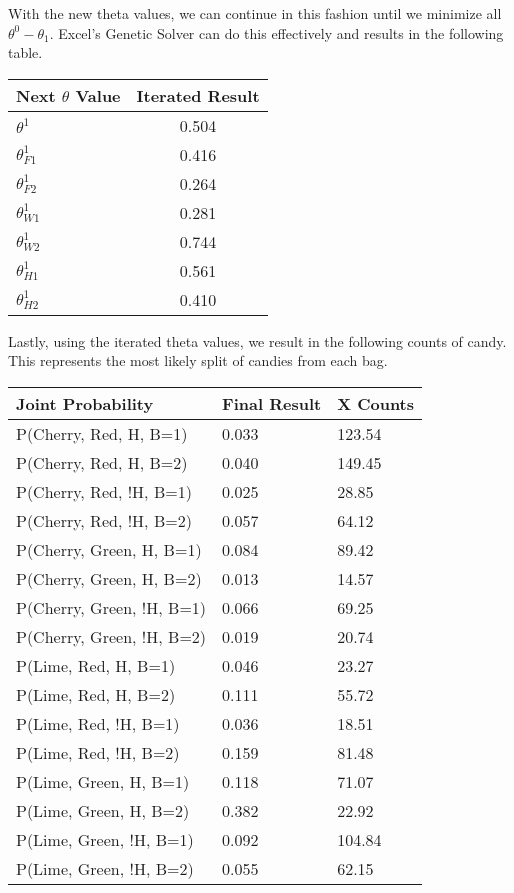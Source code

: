 \documentclass[12pt]{article}
\newenvironment{problem}[2][Problem]{\begin{trivlist}
\item[\hskip \labelsep {\bfseries #1}\hskip \labelsep {\bfseries #2.}]}{\end{trivlist}}
\begin{document}
\begin{problem}{1}
    With the new theta values, we can continue in this fashion until we minimize all $\theta^0 - \theta_1$. Excel's Genetic Solver can do this effectively
    and results in the following table.

    \begin{tabular}{|l|c|}
        \hline
        Next $\theta$ Value & Iterated Result\\
        \hline
        \hline
        $ \theta^1 $      &  0.504\\ \hline
        $ \theta_{F1}^1 $ &  0.416\\ \hline
        $ \theta_{F2}^1 $ &  0.264\\ \hline
        $ \theta_{W1}^1 $ &  0.281\\ \hline
        $ \theta_{W2}^1 $ &  0.744\\ \hline
        $ \theta_{H1}^1 $ &  0.561\\ \hline
        $ \theta_{H2}^1 $ &  0.410\\ \hline
    \end{tabular}

    Lastly, using the iterated theta values, we result in the following counts of candy. This represents the most likely split of candies from each bag.

\begin{tabular}{|l|l|l|}
        \hline
        Joint Probability & Final Result & X Counts\\
        \hline
        \hline
        P(Cherry, Red, H, B=1)    &  0.033 & 123.54\\ \hline
        P(Cherry, Red, H, B=2)    &  0.040 & 149.45\\ \hline
        P(Cherry, Red, !H, B=1)   &  0.025 & 28.85\\ \hline
        P(Cherry, Red, !H, B=2)   &  0.057 & 64.12\\ \hline
        P(Cherry, Green, H, B=1)  &  0.084 & 89.42\\ \hline
        P(Cherry, Green, H, B=2)  &  0.013 & 14.57\\ \hline
        P(Cherry, Green, !H, B=1) &  0.066 & 69.25\\ \hline
        P(Cherry, Green, !H, B=2) &  0.019 & 20.74\\ \hline
        P(Lime, Red, H, B=1)      &  0.046 & 23.27\\ \hline
        P(Lime, Red, H, B=2)      &  0.111 & 55.72\\ \hline
        P(Lime, Red, !H, B=1)     &  0.036 & 18.51\\ \hline
        P(Lime, Red, !H, B=2)     &  0.159 & 81.48\\ \hline
        P(Lime, Green, H, B=1)    &  0.118 & 71.07\\ \hline
        P(Lime, Green, H, B=2)    &  0.382 & 22.92\\ \hline
        P(Lime, Green, !H, B=1)   &  0.092 & 104.84\\ \hline
        P(Lime, Green, !H, B=2)   &  0.055 & 62.15\\ \hline
    \end{tabular}



\end{problem}
\end{document}
